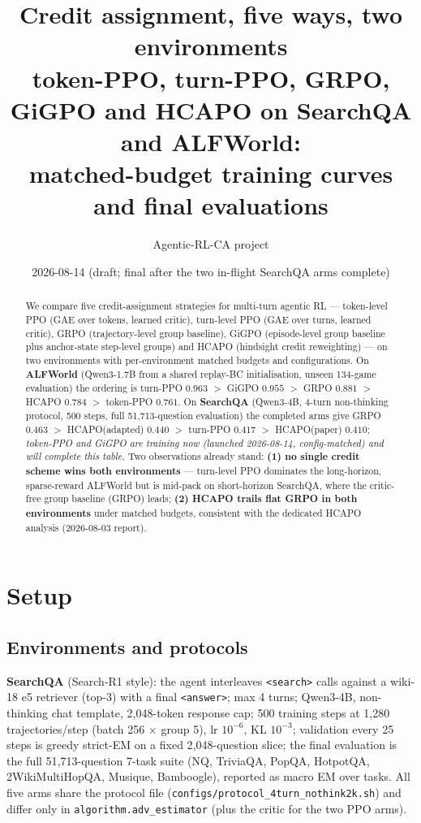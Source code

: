 \documentclass[11pt]{article}
\title{\textbf{Credit assignment, five ways, two environments}\\[3pt]
\large token-PPO, turn-PPO, GRPO, GiGPO and HCAPO on SearchQA and ALFWorld:\\
matched-budget training curves and final evaluations}
\author{Agentic-RL-CA project}
\date{2026-08-14 (draft; final after the two in-flight SearchQA arms complete)}
\newcommand{\pending}[1]{\textcolor{orange!80!black}{\textit{#1}}}
\begin{document}
\maketitle

\begin{abstract}
\noindent We compare five credit-assignment strategies for multi-turn agentic RL --- token-level
PPO (GAE over tokens, learned critic), turn-level PPO (GAE over turns, learned critic), GRPO
(trajectory-level group baseline), GiGPO (episode-level group baseline plus anchor-state
step-level groups) and HCAPO (hindsight credit reweighting) --- on two environments with
per-environment matched budgets and configurations. On \textbf{ALFWorld} (Qwen3-1.7B from a
shared replay-BC initialisation, unseen 134-game evaluation) the ordering is
turn-PPO $0.963$ $>$ GiGPO $0.955$ $>$ GRPO $0.881$ $>$ HCAPO $0.784$ $>$ token-PPO $0.761$.
On \textbf{SearchQA} (Qwen3-4B, 4-turn non-thinking protocol, 500 steps, full 51{,}713-question
evaluation) the completed arms give GRPO $0.463$ $>$ HCAPO(adapted) $0.440$ $>$ turn-PPO $0.417$
$>$ HCAPO(paper) $0.410$; \pending{token-PPO and GiGPO are training now (launched 2026-08-14,
config-matched) and will complete this table.} Two observations already stand:
\textbf{(1) no single credit scheme wins both environments} --- turn-level PPO dominates the
long-horizon, sparse-reward ALFWorld but is mid-pack on short-horizon SearchQA, where the
critic-free group baseline (GRPO) leads; \textbf{(2) HCAPO trails flat GRPO in both environments}
under matched budgets, consistent with the dedicated HCAPO analysis (2026-08-03 report).
\end{abstract}

\section{Setup}
\subsection{Environments and protocols}
\textbf{SearchQA} (Search-R1 style): the agent interleaves \texttt{<search>} calls against a
wiki-18 e5 retriever (top-3) with a final \texttt{<answer>}; max 4 turns; Qwen3-4B, non-thinking
chat template, 2{,}048-token response cap; 500 training steps at 1{,}280 trajectories/step
(batch 256 $\times$ group 5), lr $10^{-6}$, KL $10^{-3}$; validation every 25 steps is greedy
strict-EM on a fixed 2{,}048-question slice; the final evaluation is the full 51{,}713-question
7-task suite (NQ, TriviaQA, PopQA, HotpotQA, 2WikiMultiHopQA, Musique, Bamboogle), reported as
macro EM over tasks. All five arms share the protocol file
(\texttt{configs/protocol\_4turn\_nothink2k.sh}) and differ only in
\texttt{algorithm.adv\_estimator} (plus the critic for the two PPO arms).
\end{document}
